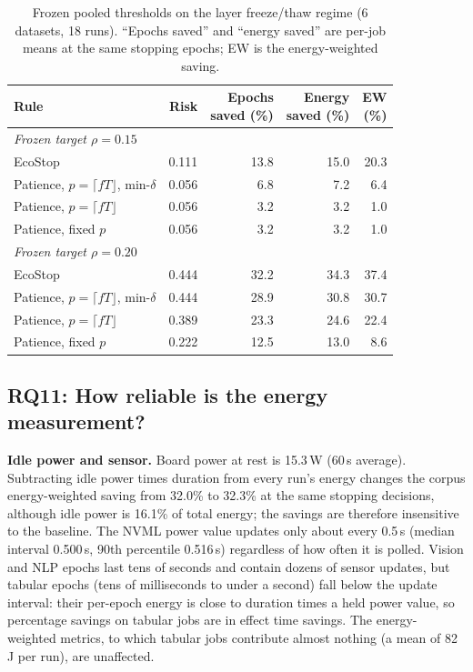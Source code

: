 \documentclass[3p,twocolumn,10pt]{elsarticle}
\theoremstyle{definition}
\begin{document}
\begin{table}[t]
\centering
\caption{Frozen pooled thresholds on the layer freeze/thaw regime (6 datasets, 18 runs). ``Epochs saved'' and ``energy saved'' are per-job means at the same stopping epochs; EW is the energy-weighted saving.}
\label{tab:b2}
\footnotesize
\begin{adjustbox}{max width=\columnwidth}
\begin{tabular}{p{3.0cm}rrrr}
\toprule
Rule & Risk & \shortstack{Epochs\\saved (\%)} & \shortstack{Energy\\saved (\%)} & \shortstack{EW\\(\%)} \\
\midrule
\multicolumn{5}{l}{\emph{Frozen target $\rho=0.15$}}\\
EcoStop & 0.111 & 13.8 & 15.0 & 20.3 \\
Patience, $p=\lceil fT\rfloor$, min-$\delta$ & 0.056 & 6.8 & 7.2 & 6.4 \\
Patience, $p=\lceil fT\rfloor$ & 0.056 & 3.2 & 3.2 & 1.0 \\
Patience, fixed $p$ & 0.056 & 3.2 & 3.2 & 1.0 \\
\midrule
\multicolumn{5}{l}{\emph{Frozen target $\rho=0.20$}}\\
EcoStop & 0.444 & 32.2 & 34.3 & 37.4 \\
Patience, $p=\lceil fT\rfloor$, min-$\delta$ & 0.444 & 28.9 & 30.8 & 30.7 \\
Patience, $p=\lceil fT\rfloor$ & 0.389 & 23.3 & 24.6 & 22.4 \\
Patience, fixed $p$ & 0.222 & 12.5 & 13.0 & 8.6 \\
\bottomrule
\end{tabular}
\end{adjustbox}
\end{table}

\subsection{RQ11: How reliable is the energy measurement?}
\label{sec:rq6b}
\textbf{Idle power and sensor.} Board power at rest is 15.3\,W (60\,s average). Subtracting idle power times duration from every run's energy changes the corpus energy-weighted saving from 32.0\% to 32.3\% at the same stopping decisions, although idle power is 16.1\% of total energy; the savings are therefore insensitive to the baseline. The NVML power value updates only about every 0.5\,s (median interval 0.500\,s, 90th percentile 0.516\,s) regardless of how often it is polled. Vision and NLP epochs last tens of seconds and contain dozens of sensor updates, but tabular epochs (tens of milliseconds to under a second) fall below the update interval: their per-epoch energy is close to duration times a held power value, so percentage savings on tabular jobs are in effect time savings. The energy-weighted metrics, to which tabular jobs contribute almost nothing (a mean of 82\,J per run), are unaffected.
\end{document}
